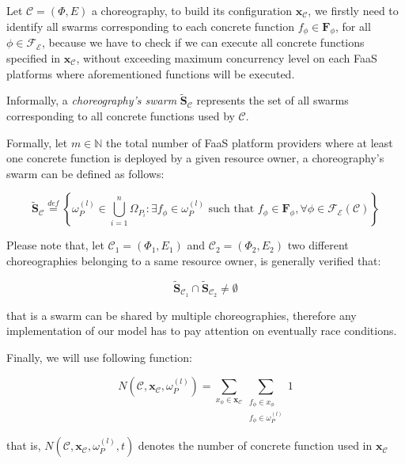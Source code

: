 \documentclass[12pt,a4paper]{report}
\newcommand{\mathDef}{\overset{\textit{def}}{=}}
\newcommand{\N}{\mathbb{N}}
\begin{document}
Let $\mathcal{C} = (\Phi,E)$ a choreography, to build its configuration $\textbf{x}_{\mathcal{C}}$, we firstly need to identify all swarms corresponding to each concrete function $f_{\phi} \in \textbf{F}_{\phi}$, for all $\phi \in \mathscr{F_E}$, because we have to check if we can execute all concrete functions specified in $\textbf{x}_{\mathcal{C}}$, without exceeding maximum concurrency level on each FaaS platforms where aforementioned functions will be executed.

Informally, a \textit{choreography's swarm} $\widetilde{\textbf{S}}_{\mathcal{C}}$ represents the set of all swarms corresponding to all concrete functions used by $\mathcal{C}$. 

Formally, let $m \in \N$ the total number of FaaS platform providers where at least one concrete function is deployed by a given resource owner, a choreography's swarm can be defined as follows:

\begin{equation}
	\widetilde{\textbf{S}}_{\mathcal{C}} \mathDef \left\{ \omega_{P}^{(l)} \in \bigcup_{i=1}^n \Omega_{P_i} : \exists f_{\phi} \in \omega_{P}^{(l)} \text{ such that } f_{\phi} \in \textbf{F}_{\phi}, \forall \phi \in \mathscr{F_E}(\mathcal{C}) \right\}
\end{equation}

Please note that, let $\mathcal{C}_1 = (\Phi_1,E_1)$ and $\mathcal{C}_2 = (\Phi_2,E_2)$ two different choreographies belonging to a same resource owner, is generally verified that:

\begin{equation}
	\widetilde{\textbf{S}}_{\mathcal{C}_1} \cap \widetilde{\textbf{S}}_{\mathcal{C}_2} \neq \emptyset
\end{equation}

that is a swarm can be shared by multiple choreographies, therefore any implementation of our model has to pay attention on eventually race conditions. 

Finally, we will use following function:

\begin{equation}
	N(\mathcal{C},\textbf{x}_{\mathcal{C}},\omega_{P}^{(l)}) = \sum_{x_{\phi} \in \textbf{x}_{\mathcal{C}}} \sum_{\substack{f_{\phi} \in x_{\phi} \\ f_{\phi} \in \omega_{P}^{(l)}}} 1
\end{equation}

that is, $N(\mathcal{C},\textbf{x}_{\mathcal{C}},\omega_{P}^{(l)},t)$ denotes the number of concrete function used in $\textbf{x}_{\mathcal{C}}$ 
\end{document}

